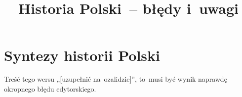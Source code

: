 \documentclass[a4paper,11pt]{article}
\title{Historia Polski~-- błędy i~uwagi}
\begin{document}





\maketitle  %





\section{Syntezy historii Polski}

\vspace{\spaceTwo}







\start {} Treść tego wersu „[uzupełnić na~ozalidzie]”,
to~musi być wynik naprawdę okropnego błędu edytorskiego.






\end{document}
